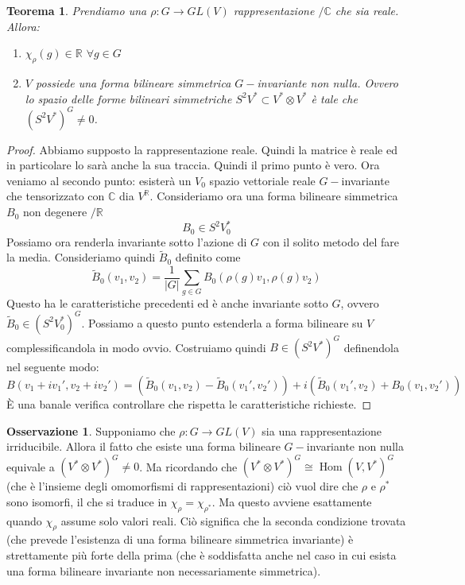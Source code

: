 \documentclass[11pt]{article}
\theoremstyle{plain}
\newtheorem{thm}{Teorema}[section]
\theoremstyle{definition}
\newtheorem*{rem}{Osservazione}
\theoremstyle{remark}
\newcommand{\C}{\mathbb{C}}
\newcommand{\R}{\mathbb{R}}
\newcommand{\dsum}{\displaystyle\sum}
\DeclareMathOperator{\Hom}{Hom}
\begin{document}
\begin{thm}
Prendiamo una $\rho:G\to GL(V)$ rappresentazione $/\C$ che sia reale. Allora:
\begin{enumerate}
\item $\chi_\rho(g)\in \R$ $\forall g\in G$ 
\item $V$ possiede una forma bilineare simmetrica $G-$invariante non nulla. Ovvero lo spazio delle forme bilineari simmetriche $S^2V^*\subset V^*\otimes V^*$ è tale che $(S^2V^*)^G\neq 0$.
\end{enumerate} 
\end{thm}

\begin{proof}
Abbiamo supposto la rappresentazione reale. Quindi la matrice è reale ed in particolare lo sarà anche la sua traccia. Quindi il primo punto è vero. Ora veniamo al secondo punto: esisterà un $V_0$ spazio vettoriale reale $G-$invariante che tensorizzato con $\C$ dia $V^\R$. Consideriamo ora una forma bilineare simmetrica $B_0$ non degenere $/\R$
\[ B_0 \in S^2 V_0^*\]
Possiamo ora renderla invariante sotto l'azione di $G$ con il solito metodo del fare la media. Consideriamo quindi $\tilde B_0$ definito come
\[ \tilde B_0(v_1, v_2) = \dfrac{1}{|G|} \dsum_{g\in G} B_0(\rho(g) v_1, \rho(g) v_2)\]
Questo ha le caratteristiche precedenti ed è anche invariante sotto $G$, ovvero $\tilde B_0\in (S^2V_0^*)^G$. Possiamo a questo punto estenderla a forma bilineare su $V$ complessificandola in modo ovvio. Costruiamo quindi $B \in (S^2V^*)^G$ definendola nel seguente modo:
\[B(v_1 + i v_1', v_2 + i v_2') = \left( \tilde B_0(v_1, v_2) - \tilde B_0(v_1', v_2')\right)  + i \left( \tilde B_0(v_1', v_2) + B_0(v_1, v_2')\right)\]
\`E una banale verifica controllare che rispetta le caratteristiche richieste.
\end{proof}

\begin{rem}
Supponiamo che $\rho:G\to GL(V)$ sia una rappresentazione irriducibile. Allora il fatto che esiste una forma bilineare $G-$invariante non nulla
equivale a $(V^*\otimes V^*)^G\neq 0$. Ma ricordando che $(V^*\otimes V^*)^G \cong \Hom(V,V^*)^G$ (che è l'insieme degli omomorfismi di rappresentazioni) ciò vuol dire che $\rho$ e $\rho^*$ sono isomorfi, il che si traduce in $\chi_\rho = \chi_{\rho^*}$. Ma questo avviene esattamente quando $\chi_\rho$ assume solo valori reali. Ciò significa che la seconda condizione trovata (che prevede l'esistenza di una forma bilineare simmetrica invariante) è strettamente più forte della prima (che è soddisfatta anche nel caso in cui esista una forma bilineare invariante non necessariamente simmetrica).
\end{rem}
\end{document}
